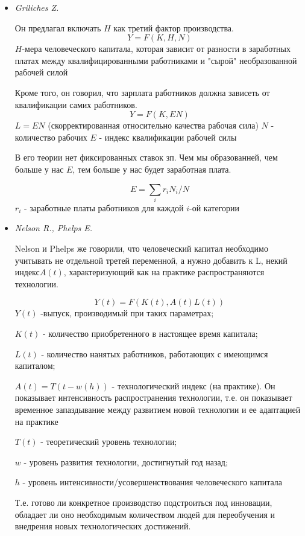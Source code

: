 \documentclass[reqno]{article}
\theoremstyle{definition}
\theoremstyle{definition}
\theoremstyle{definition}
\theoremstyle{definition}
\theoremstyle{definition}
\theoremstyle{definition}
\theoremstyle{definition}
\theoremstyle{definition}
\theoremstyle{definition}
\begin{document}
			\begin{itemize}
				\item \emph{Griliches Z.}
				
					Он предлагал включать $H$ как третий фактор производства. 
					$$Y = F(K,H,N)$$
					$H$-мера человеческого капитала, которая зависит от разности в заработных платах между квалифицированными работниками и "сырой" необразованной рабочей силой
					
					Кроме того, он говорил, что зарплата работников должна зависеть от квалификации самих работников.
					$$Y = F(K,EN)$$
					$L = EN$ (скорректированная относительно качества рабочая сила)
					$N$ - количество рабочих
					$E$ - индекс квалификации рабочей силы 
					
					В его теории нет фиксированных ставок зп. Чем  мы образованней, чем больше у нас $E$, тем больше у нас будет заработная плата.
					
					$$E = \sum_i r_i N_i/N$$
					$r_i$ - заработные платы работников для каждой $i$-ой категории
					
				\item \emph{Nelson R., Phelps E.}
				
					Nelson и Phelps же говорили, что человеческий капитал необходимо учитывать не отдельной третей переменной, а нужно добавить к L, некий индекс$A(t)$, характеризующий как на практике распространяются технологии.
					
					$$Y(t) = F \left(K(t),A(t)L(t)\right)$$
					$Y(t)$ -выпуск, производимый при таких параметрах;
					
					$K(t)$ - количество приобретенного в настоящее время капитала;
					
					$L(t)$ - количество нанятых работников, работающих с имеющимся капиталом;
					
					$A(t) = T(t-w(h))$ - технологический индекс (на практике). Он показывает интенсивность распространения технологии, т.е. он показывает временное запаздывание между развитием новой технологии и ее адаптацией на практике
					
					\setlength{\leftskip}{2em}
					$T(t)$ - теоретический уровень технологии;
					
					$w$ - уровень развития технологии, достигнутый год назад;
					
					$h$ -  уровень интенсивности/усовершенствования человеческого капитала
					
					\setlength{\leftskip}{0em}
					Т.е. готово ли конкретное производство подстроиться под инновации, обладает ли оно необходимым количеством людей для переобучения и внедрения новых технологических достижений.
					

\end{itemize}
\end{document}
